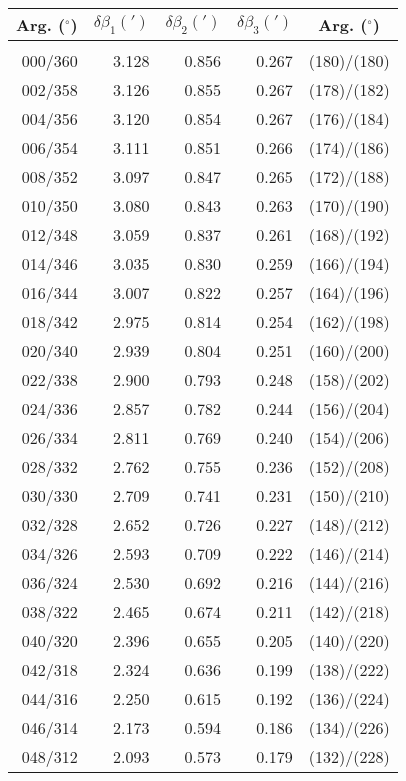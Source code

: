 \newpage
\begin{table}\centering
\small{ \begin{tabular}{rrrrc}
Arg. ($^\circ$) & $\delta\beta_1(')$ &  $\delta\beta_2(')$ &
 $\delta\beta_3(')$& Arg. ($^\circ$) \\\hline
&&&&\\[-1.75ex]
000/360 &  3.128 &  0.856 &  0.267 & (180)/(180)\\
002/358 &  3.126 &  0.855 &  0.267 & (178)/(182)\\
004/356 &  3.120 &  0.854 &  0.267 & (176)/(184)\\
006/354 &  3.111 &  0.851 &  0.266 & (174)/(186)\\
008/352 &  3.097 &  0.847 &  0.265 & (172)/(188)\\
010/350 &  3.080 &  0.843 &  0.263 & (170)/(190)\\
012/348 &  3.059 &  0.837 &  0.261 & (168)/(192)\\
014/346 &  3.035 &  0.830 &  0.259 & (166)/(194)\\
016/344 &  3.007 &  0.822 &  0.257 & (164)/(196)\\
018/342 &  2.975 &  0.814 &  0.254 & (162)/(198)\\
020/340 &  2.939 &  0.804 &  0.251 & (160)/(200)\\
022/338 &  2.900 &  0.793 &  0.248 & (158)/(202)\\
024/336 &  2.857 &  0.782 &  0.244 & (156)/(204)\\
026/334 &  2.811 &  0.769 &  0.240 & (154)/(206)\\
028/332 &  2.762 &  0.755 &  0.236 & (152)/(208)\\
030/330 &  2.709 &  0.741 &  0.231 & (150)/(210)\\
032/328 &  2.652 &  0.726 &  0.227 & (148)/(212)\\
034/326 &  2.593 &  0.709 &  0.222 & (146)/(214)\\
036/324 &  2.530 &  0.692 &  0.216 & (144)/(216)\\
038/322 &  2.465 &  0.674 &  0.211 & (142)/(218)\\
040/320 &  2.396 &  0.655 &  0.205 & (140)/(220)\\
042/318 &  2.324 &  0.636 &  0.199 & (138)/(222)\\
044/316 &  2.250 &  0.615 &  0.192 & (136)/(224)\\
046/314 &  2.173 &  0.594 &  0.186 & (134)/(226)\\
048/312 &  2.093 &  0.573 &  0.179 & (132)/(228)\\

\end{tabular}}
\end{table}
